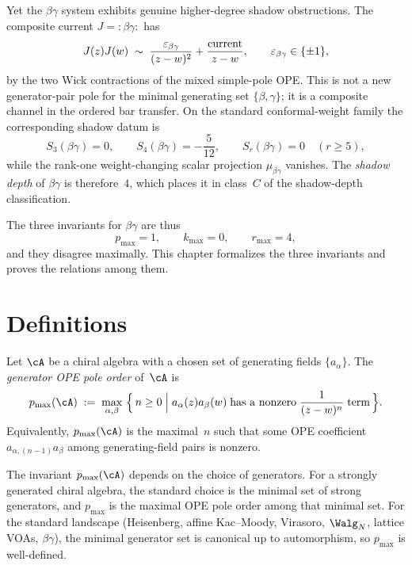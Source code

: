 Yet the $\beta\gamma$ system exhibits genuine higher-degree shadow
obstructions. The composite current $J={:}\beta\gamma{:}$ has
\[
J(z)J(w)\;\sim\;\frac{\varepsilon_{\beta\gamma}}{(z-w)^2}
       + \frac{\textup{current}}{z-w},
       \qquad \varepsilon_{\beta\gamma}\in\{\pm 1\},
\]
by the two Wick contractions of the mixed simple-pole OPE. This is
not a new generator-pair pole for the minimal generating set
$\{\beta,\gamma\}$; it is a composite channel in the ordered bar
transfer. On the standard conformal-weight family the corresponding
shadow datum is
\[
 S_3(\beta\gamma)=0,\qquad
 S_4(\beta\gamma)=-\frac{5}{12},\qquad
 S_r(\beta\gamma)=0\quad(r\geq 5),
\]
while the rank-one weight-changing scalar projection
$\mu_{\beta\gamma}$ vanishes. The \emph{shadow depth} of
$\beta\gamma$ is therefore~$4$, which places it in class~$C$ of the
shadow-depth classification.

The three invariants for $\beta\gamma$ are thus
\begin{equation}\label{eq:beta-gamma-r-max}
 p_{\max} = 1,
 \qquad
 k_{\max} = 0,
 \qquad
 r_{\max} = 4,
\end{equation}
and they disagree maximally. This chapter formalizes the three
invariants and proves the relations among them.

\section{Definitions}
\label{sec:three-invariants-definitions}

\begin{definition}
\label{def:p-max}
Let $\cA$ be a chiral algebra with a chosen set of generating
fields $\{a_\alpha\}$. The \emph{generator OPE pole order}
of~$\cA$ is
\begin{equation}\label{eq:p-max-def}
p_{\max}(\cA)
\;:=\;
\max_{\alpha,\beta}\,
\Big\{\,n \geq 0
\;\Big|\;
a_\alpha(z)a_\beta(w)
\;\text{has a nonzero}\;\frac{1}{(z-w)^n}\;\text{term}\,\Big\}.
\end{equation}
Equivalently, $p_{\max}(\cA)$ is the maximal~$n$ such that some
OPE coefficient $a_{\alpha,(n-1)}a_\beta$ among
generating-field pairs is nonzero.
\end{definition}

\begin{remark}
\label{rem:p-max-generator-choice}
The invariant $p_{\max}(\cA)$ depends on the choice of generators.
For a strongly generated chiral algebra, the standard choice is the
minimal set of strong generators, and $p_{\max}$ is the maximal OPE
pole order among that minimal set. For the standard landscape
\textup{(}Heisenberg, affine Kac--Moody, Virasoro, $\Walg_N$,
lattice VOAs, $\beta\gamma$\textup{)}, the minimal generator set is
canonical up to automorphism, so $p_{\max}$ is well-defined.
\end{remark}

